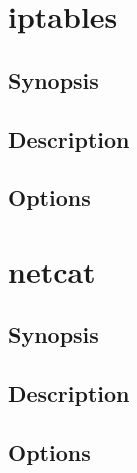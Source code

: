 \documentclass[a4paper, 10pt, onecolumn, openright, oneside]{book}
\begin{document}
		\section{iptables}
			\subsection{Synopsis}
			\subsection{Description}
			\subsection{Options}
		\section{netcat}
			\subsection{Synopsis}
			\subsection{Description}
			\subsection{Options}
\end{document}
